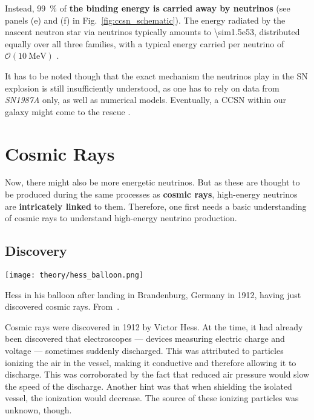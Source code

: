 Instead, \SI{99}{\percent} of \textbf{the binding energy is carried away by neutrinos} (see panels (e) and (f) in Fig.~\ref{fig:ccsn_schematic}). The energy radiated by the nascent neutron star via neutrinos typically amounts to \SI{\sim1.5e53}{\erg}, distributed equally over all three families, with a typical energy carried per neutrino of $\mathcal{O}(\SI{10}{\mega\eV})$ .

It has to be noted though that the exact mechanism the neutrinos play in the SN explosion is still insufficiently understood, as one has to rely on data from \emph{SN1987A} only, as well as numerical models. Eventually, a CCSN within our galaxy might come to the rescue .

\section{Cosmic Rays}\label{cosmic_rays}

Now, there might also be more energetic neutrinos. But as these are thought to be produced during the same processes as \textbf{cosmic rays}, high-energy neutrinos are \textbf{intricately linked} to them. Therefore, one first needs a basic understanding of cosmic rays to understand high-energy neutrino production.

\subsection{Discovery}

\begin{marginfigure}
    \texttt{[image: theory/hess\_balloon.png]}
    \caption[Hess in his balloon]{Hess in his balloon after landing in Brandenburg, Germany in 1912, having just discovered cosmic rays. From~\cite{Steinmaurer1985}.}
\end{marginfigure}

Cosmic rays were discovered in 1912 by Victor Hess. At the time, it had already been discovered that electroscopes --- devices measuring electric charge and voltage --- sometimes suddenly discharged. This was attributed to particles ionizing the air in the vessel, making it conductive and therefore allowing it to discharge. This was corroborated by the fact that reduced air pressure would slow the speed of the discharge. Another hint was that when shielding the isolated vessel, the ionization would decrease. The source of these ionizing particles was unknown, though.

